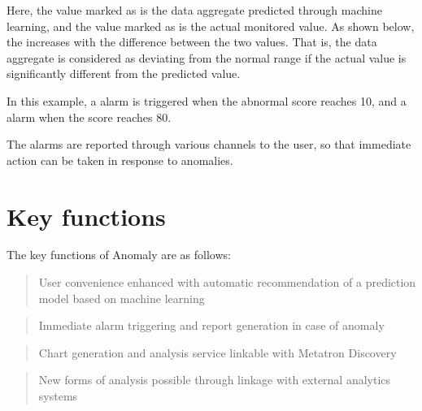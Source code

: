 \documentclass[letterpaper,10pt,english]{sphinxmanual}
\begin{document}
Here, the value marked as  is the data aggregate predicted through machine learning, and the value marked as  is the actual monitored value. As shown below, the  increases with the difference between the two values. That is, the data aggregate is considered as deviating from the normal range if the actual value is significantly different from the predicted value.
\begin{quote}

\begin{figure}[H]
\centering

\noindent{}
\end{figure}
\end{quote}

In this example, a  alarm is triggered when the abnormal score reaches 10, and a  alarm when the score reaches 80.

The alarms are reported through various channels to the user, so that immediate action can be taken in response to anomalies.


\section{Key functions}
\label{\detokenize{anomaly/part01/index:id2}}
The key functions of Anomaly are as follows:

\begin{quote}

User convenience enhanced with automatic recommendation of a prediction model based on machine learning
\end{quote}

\begin{quote}

Immediate alarm triggering and report generation in case of anomaly
\end{quote}

\begin{quote}

Chart generation and analysis service linkable with Metatron Discovery
\end{quote}

\begin{quote}

New forms of analysis possible through linkage with external analytics systems
\end{quote}
\end{document}
